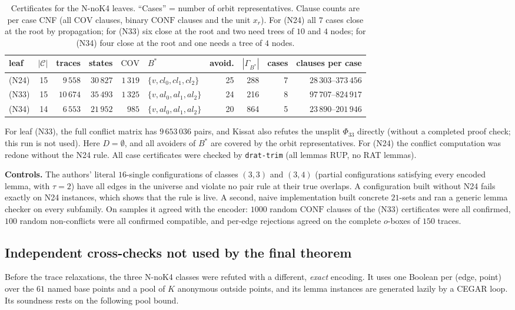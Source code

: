 \documentclass[11pt]{amsart}
\theoremstyle{definition}
\newcommand{\Cov}{\mathrm{COV}}
\newcommand{\Conf}{\mathrm{CONF}}
\begin{document}
\begin{table}[ht]\small
\caption{Certificates for the N-noK4 leaves. ``Cases'' = number of orbit representatives. Clause counts are per case CNF (all $\Cov$ clauses, binary $\Conf$ clauses and the unit $x_r$). For (N24) all $7$ cases close at the root by propagation; for (N33) six close at the root and two need trees of $10$ and $4$ nodes; for (N34) four close at the root and one needs a tree of $4$ nodes.}\label{tab:nok4}
\setlength{\tabcolsep}{3.5pt}
\begin{tabular}{@{}lrrrrlrrrr@{}}
\toprule
leaf & $|\mathcal C|$ & traces & states & $\Cov$ & $B^*$ & avoid. & $|\Gamma_{B^*}|$ & cases & clauses per case\\
\midrule
(N24) & 15 & $9\,558$ & $30\,827$ & $1\,319$ & $\{v,cl_0,cl_1,cl_2\}$ & 25 & 288 & 7 & $28\,303$--$373\,456$\\
(N33) & 15 & $10\,674$ & $35\,493$ & $1\,325$ & $\{v,al_0,al_1,al_2\}$ & 24 & 216 & 8 & $97\,707$--$824\,917$\\
(N34) & 14 & $6\,553$ & $21\,952$ & $985$ & $\{v,al_0,al_1,al_2\}$ & 20 & 864 & 5 & $23\,890$--$201\,946$\\
\bottomrule
\end{tabular}
\end{table}

For leaf (N33), the full conflict matrix has $9\,653\,036$ pairs, and Kissat also refutes the unsplit $\Phi_{33}$ directly (without a completed proof check; this run is not used). Here $D=\emptyset$, and all avoiders of $B^*$ are covered by the orbit representatives. For (N24) the conflict computation was redone without the N24 rule. All case certificates were checked by \texttt{drat-trim} (all lemmas RUP, no RAT lemmas).

\textbf{Controls.} The authors' literal $16$-single configurations of classes $(3,3)$ and $(3,4)$ (partial configurations satisfying every encoded lemma, with $\tau=2$) have all edges in the universe and violate no pair rule at their true overlaps. A configuration built without N24 fails exactly on N24 instances, which shows that the rule is live. A second, naive implementation built concrete $21$-sets and ran a generic lemma checker on every subfamily. On samples it agreed with the encoder: $1000$ random $\Conf$ clauses of the (N33) certificates were all confirmed, $100$ random non-conflicts were all confirmed compatible, and per-edge rejections agreed on the complete $o$-boxes of $150$ traces.

\subsection{Independent cross-checks not used by the final theorem}\label{sec:xcheck}
Before the trace relaxations, the three N-noK4 classes were refuted with a different, \emph{exact} encoding. It uses one Boolean per (edge, point) over the $61$ named base points and a pool of $K$ anonymous outside points, and its lemma instances are generated lazily by a CEGAR loop. Its soundness rests on the following pool bound.
\end{document}

